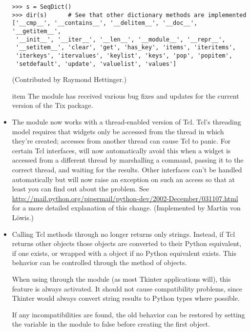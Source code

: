 \documentclass{howto}
\begin{document}
\begin{itemize}
\begin{verbatim}
>>> s = SeqDict()
>>> dir(s)      # See that other dictionary methods are implemented
['__cmp__', '__contains__', '__delitem__', '__doc__', '__getitem__',
 '__init__', '__iter__', '__len__', '__module__', '__repr__',
 '__setitem__', 'clear', 'get', 'has_key', 'items', 'iteritems',
 'iterkeys', 'itervalues', 'keylist', 'keys', 'pop', 'popitem',
 'setdefault', 'update', 'valuelist', 'values']
\end{verbatim}

(Contributed by Raymond Hettinger.)

item The  module has received various bug fixes and
updates for the current version of the Tix package.

\item The  module now works with a thread-enabled 
version of Tcl.  Tcl's threading model requires that widgets only be
accessed from the thread in which they're created; accesses from
another thread can cause Tcl to panic.  For certain Tcl interfaces,
 will now automatically avoid this 
when a widget is accessed from a different thread by marshalling a
command, passing it to the correct thread, and waiting for the
results.  Other interfaces can't be handled automatically but
 will now raise an exception on such an access so that
at least you can find out about the problem.  See
\url{http://mail.python.org/pipermail/python-dev/2002-December/031107.html}
for a more detailed explanation of this change.  (Implemented by
Martin von L\"owis.)

\item Calling Tcl methods through  no longer 
returns only strings. Instead, if Tcl returns other objects those
objects are converted to their Python equivalent, if one exists, or
wrapped with a  object if no Python equivalent
exists. This behavior can be controlled through the
 method of  objects.

When using  through the  module (as
most Tkinter applications will), this feature is always activated. It
should not cause compatibility problems, since Tkinter would always
convert string results to Python types where possible.

If any incompatibilities are found, the old behavior can be restored
by setting the  variable in the 
module to false before creating the first  object.


\end{itemize}
\end{document}
